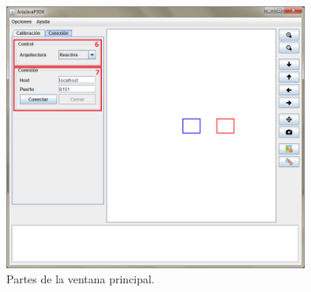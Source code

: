 \documentclass[11pt,twoside,A5]{article}
\begin{document}
\begin{figure}[H]
\begin{center}
\includegraphics[width=10cm]{ventana-principal-conexion-partes.png} 
\caption{Partes de la ventana principal.}
\label{fig:ventana-principal-conexion}
\end{center}
\end{figure} 
\end{document}
